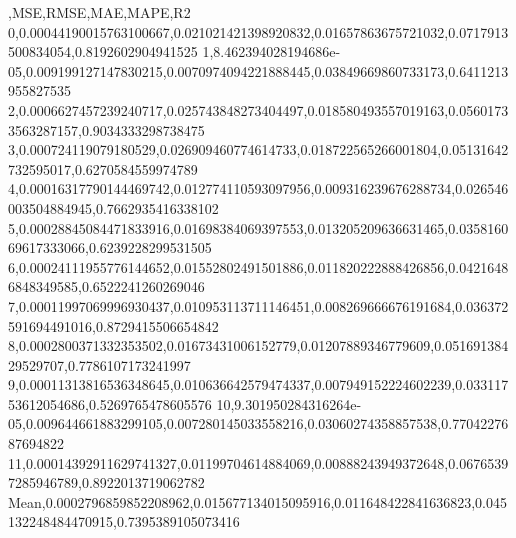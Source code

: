 ,MSE,RMSE,MAE,MAPE,R2
0,0.00044190015763100667,0.021021421398920832,0.01657863675721032,0.0717913500834054,0.8192602904941525
1,8.462394028194686e-05,0.009199127147830215,0.0070974094221888445,0.03849669860733173,0.6411213955827535
2,0.0006627457239240717,0.025743848273404497,0.018580493557019163,0.05601733563287157,0.9034333298738475
3,0.000724119079180529,0.026909460774614733,0.018722565266001804,0.05131642732595017,0.6270584559974789
4,0.00016317790144469742,0.012774110593097956,0.009316239676288734,0.026546003504884945,0.7662935416338102
5,0.00028845084471833916,0.01698384069397553,0.013205209636631465,0.035816069617333066,0.6239228299531505
6,0.00024111955776144652,0.01552802491501886,0.011820222888426856,0.04216486848349585,0.6522241260269046
7,0.00011997069996930437,0.010953113711146451,0.008269666676191684,0.036372591694491016,0.8729415506654842
8,0.0002800371332353502,0.01673431006152779,0.01207889346779609,0.05169138429529707,0.7786107173241997
9,0.00011313816536348645,0.010636642579474337,0.007949152224602239,0.03311753612054686,0.5269765478605576
10,9.301950284316264e-05,0.009644661883299105,0.007280145033558216,0.03060274358857538,0.7704227687694822
11,0.00014392911629741327,0.01199704614884069,0.00888243949372648,0.06765397285946789,0.8922013719062782
Mean,0.0002796859852208962,0.015677134015095916,0.011648422841636823,0.045132248484470915,0.7395389105073416
